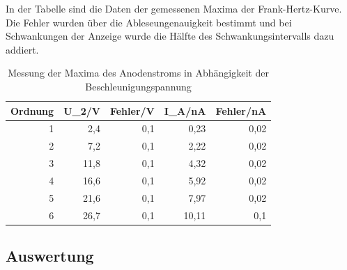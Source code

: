 \documentclass[12pt,a4paper]{article}
\begin{document}
In der Tabelle sind die Daten der gemessenen Maxima der Frank-Hertz-Kurve. Die Fehler wurden über die Ableseungenauigkeit bestimmt und bei Schwankungen der Anzeige wurde die Hälfte des Schwankungsintervalls dazu addiert.

\begin{table}[H]
\caption{Messung der Maxima des  Anodenstroms in Abhängigkeit der Beschleunigungspannung}
\begin{center}
\begin{tabular}{|r|r|r|r|r|}
\hline
\multicolumn{1}{|l|}{Ordnung} & \multicolumn{1}{l|}{U\_2/V} & \multicolumn{1}{l|}{Fehler/V} & \multicolumn{1}{l|}{I\_A/nA} & \multicolumn{1}{l|}{Fehler/nA} \\ \hline
1 & 2,4 & 0,1 & 0,23 & 0,02 \\ \hline
2 & 7,2 & 0,1 & 2,22 & 0,02 \\ \hline
3 & 11,8 & 0,1 & 4,32 & 0,02 \\ \hline
4 & 16,6 & 0,1 & 5,92 & 0,02 \\ \hline
5 & 21,6 & 0,1 & 7,97 & 0,02 \\ \hline
6 & 26,7 & 0,1 & 10,11 & 0,1 \\ \hline
\end{tabular}
\end{center}
\label{tab:q__max_messung}
\end{table}



\subsection{Auswertung}
\end{document}
